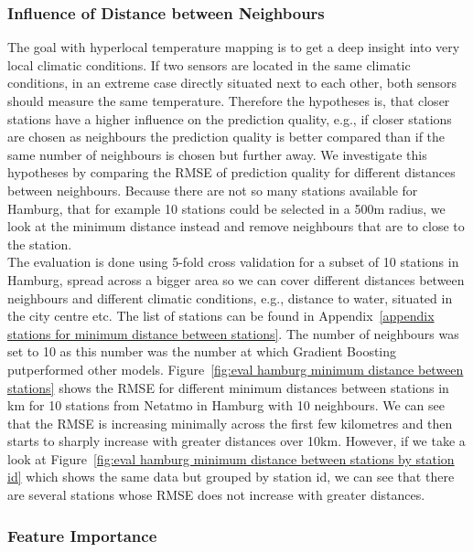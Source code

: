 \subsubsection{Influence of Distance between Neighbours}

The goal with hyperlocal temperature mapping is to get a deep insight into very local climatic conditions. If two sensors are located in the same climatic conditions, in an extreme case directly situated next to each other, both sensors should measure the same temperature. Therefore the hypotheses is, that closer stations have a higher influence on the prediction quality, e.g., if closer stations are chosen as neighbours the prediction quality is better compared than if the same number of neighbours is chosen but further away. We investigate this hypotheses by comparing the RMSE of prediction quality for different distances between neighbours. Because there are not so many stations available for Hamburg, that for example 10 stations could be selected in a 500m radius, we look at the minimum distance instead and remove neighbours that are to close to the station.\\
The evaluation is done using 5-fold cross validation for a subset of 10 stations in Hamburg, spread across a bigger area so we can cover different distances between neighbours and different climatic conditions, e.g., distance to water, situated in the city centre etc. The list of stations can be found in Appendix~\ref{appendix stations for minimum distance between stations}. The number of neighbours was set to 10 as this number was the number at which Gradient Boosting putperformed other models. Figure~\ref{fig:eval hamburg minimum distance between stations} shows the RMSE for different minimum distances between stations in km for 10 stations from Netatmo in Hamburg with 10 neighbours. We can see that the RMSE is increasing minimally across the first few kilometres and then starts to sharply increase with greater distances over 10km. However, if we take a look at Figure~\ref{fig:eval hamburg minimum distance between stations by station id} which shows the same data but grouped by station id, we can see that there are several stations whose RMSE does not increase with greater distances.\\ %

\subsubsection{Feature Importance}

